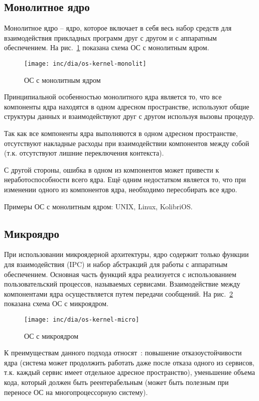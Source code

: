 \subsection{Монолитное ядро}
Монолитное ядро -- ядро, которое включает в себя весь набор средств для
взаимодействия прикладных программ друг с другом и с аппаратным обеспечением.
На рис.~\ref{fig:os-kernel-monolit} показана схема ОС с монолитным ядром.

\begin{figure}[ht!]
  \centering
  \texttt{[image: inc/dia/os-kernel-monolit]}
  \caption{ОС с монолитным ядром}
  \label{fig:os-kernel-monolit}
\end{figure}

Принципиальной особенностью монолитного ядра является то, что все компоненты
ядра находятся в одном адресном пространстве, используют общие структуры
данных и взаимодействуют друг с другом используя вызовы процедур.

Так как все компоненты ядра выполняются в одном адресном пространстве,
отсутствуют накладные расходы при взаимодействии компонентов между собой (т.к.
отсутствуют лишние переключения контекста).

С другой стороны, ошибка в одном из компонентов может привести к
неработоспособности всего ядра. Ещё одним недостатком является то,
что при изменении одного из компонентов ядра, необходимо
пересобирать все ядро.

Примеры ОС с монолитным ядром: UNIX, Linux, KolibriOS.

\subsection{Микроядро}
При использовании микроядерной архитектуры, ядро содержит только функции для
взаимодействия (IPC) и набор абстракций для работы с аппаратным обеспечением.
Основная часть функций ядра реализуется с использованием пользовательский
процессов, называемых сервисами. Взаимодействие между компонентами ядра
осуществляется путем передачи сообщений. На рис.~\ref{fig:os-kernel-micro} показана
схема ОС с микроядром.

\begin{figure}[ht!]
  \centering
  \texttt{[image: inc/dia/os-kernel-micro]}
  \caption{ОС с микроядром}
  \label{fig:os-kernel-micro}
\end{figure}

К преимуществам данного подхода относят~\cite{os_dev}: повышение
отказоустойчивости ядра (система может продолжить работать даже после
отказа одного из сервисов, т.к. каждый сервис имеет отдельное адресное
пространство), уменьшение объема кода, который должен быть реентерабельным
(может быть полезным при переносе ОС на многопроцессорную систему).

